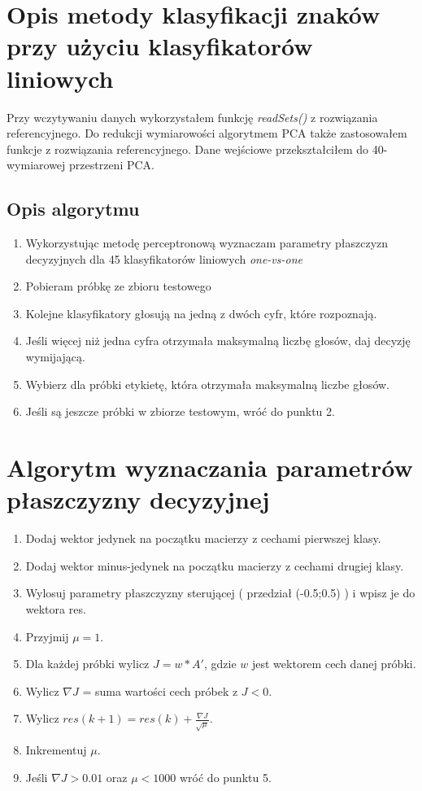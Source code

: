 \documentclass[12pt,a4paper,notitlepage]{article}
\begin{document}
\rhead{}

\pagestyle{fancy}

\section{Opis metody klasyfikacji znaków przy użyciu klasyfikatorów liniowych}
Przy wczytywaniu danych wykorzystałem funkcję \textit{readSets()} z rozwiązania referencyjnego. Do redukcji wymiarowości algorytmem PCA także zastosowałem funkcje z rozwiązania referencyjnego. Dane wejściowe przekształciłem do 40-wymiarowej przestrzeni PCA. 
\subsection{Opis algorytmu}
\begin{enumerate}
\item Wykorzystując metodę perceptronową wyznaczam parametry płaszczyzn decyzyjnych dla 45 klasyfikatorów liniowych \textit{one-vs-one}
\item Pobieram próbkę ze zbioru testowego
\item Kolejne klasyfikatory głosują na jedną z dwóch cyfr, które rozpoznają. 
\item Jeśli więcej niż jedna cyfra otrzymała maksymalną liczbę głosów, daj decyzję wymijającą. 
\item Wybierz dla próbki etykietę, która otrzymała maksymalną liczbe głosów. 
\item Jeśli są jeszcze próbki w zbiorze testowym, wróć do punktu 2. 
\end{enumerate}


\section{Algorytm wyznaczania parametrów płaszczyzny decyzyjnej}
\begin{enumerate}
\item Dodaj wektor jedynek na początku macierzy z cechami pierwszej klasy.
\item Dodaj wektor minus-jedynek na początku macierzy z cechami drugiej klasy. 
\item Wylosuj parametry płaszczyzny sterującej ( przedział (-0.5;0.5) ) i wpisz je do wektora res.
\item Przyjmij $\mu = 1$.
\item Dla każdej próbki wylicz $ J = w * A' $, gdzie $w$ jest wektorem cech danej próbki. 
\item Wylicz $ \nabla J $ = suma wartości cech próbek z $ J < 0$.
\item Wylicz $res(k+1)=res(k) + \frac{\nabla J  }{\sqrt{\mu}}$.
\item Inkrementuj $\mu$.
\item Jeśli $\nabla J > 0.01 $ oraz $\mu < 1000 $ wróć do punktu 5. 
\end{enumerate}
\end{document}
